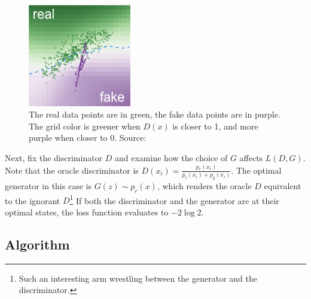 \documentclass[12pt]{article}
\begin{document}
\begin{figure}[!htbp]
    \centering
    \includegraphics[width=0.4\textwidth]{../Figures/Discriminator.png}
    \caption{The real data points are in green, the fake data points are in purple. The grid color is greener when $D(x)$ is closer to 1, and more purple when closer to 0. Source: \citet{kahng2018gan}}
    \label{fig:discriminator}
\end{figure}

Next, fix the discriminator \(D\) and examine how the choice of \(G\) affects
\(L(D, G)\). Note that the oracle discriminator is \(D(x_i) =
\frac{p_r(x_i)}{p_r(x_i) + p_g(x_i)}\). The optimal generator in this case is
\(G(z) \sim p_r(x)\), which renders the oracle \(D\) equivalent to the ignorant
\(D\)\footnote{Such an interesting arm wrestling between the generator and the
    discriminator. }
If both the discriminator and the generator are at their optimal states, the
loss function evaluates to \(-2\log 2\).

\subsection{Algorithm} \label{subsec:algorithm}
\end{document}
